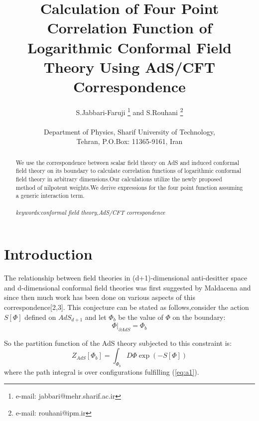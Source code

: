 \documentclass[a4paper,12pt]{article}
\begin{document}
\title{Calculation of Four Point Correlation Function of Logarithmic Conformal Field Theory Using AdS/CFT
Correspondence}
\author{S.Jabbari-Faruji    \footnote{e-mail: jabbari@mehr.sharif.ac.ir}  and
S.Rouhani
\footnote{e-mail: rouhani@ipm.ir}\\
\\
Department of Physics, Sharif University of Technology,\\ Tehran,
P.O.Box: 11365-9161, Iran}
\date{}
\maketitle
\begin{abstract}
 We use the correspondence between scalar field theory on AdS
and induced conformal field theory on its boundary to calculate
correlation functions of logarithmic conformal field theory in
arbitrary dimensions.Our calculations utilize the newly proposed
method of nilpotent weights.We derive expressions for the four
point function assuming a generic interaction term.
\\
\\
{\it keywords:conformal field theory,AdS/CFT  correspondence}
\end{abstract}
\section{Introduction}
            The relationship between field theories in (d+1)-dimensional anti-desitter space and d-dimensional
          conformal field theories was first suggested by Maldacena  and since then much work has been done
          on various aspects of this correspondence[2,3].
            This conjecture can be stated as follows,consider the action $S[\Phi]$ defined on $AdS_{d+1}$ and let
            $\Phi_{b}$
          be the value of $\Phi$ on the boundary:
          \begin{equation}\label{eq:a1}
                                \Phi|_{\partial AdS}=\Phi_{b}
                                \end{equation}

         So the partition function of the AdS theory subjected to this constraint is:
\begin{equation}
         Z_{AdS}[\Phi_{b}]=\int_{\Phi_{b}}
         D\Phi\exp(-S[\Phi])\end{equation}
          where the path integral is over configurations fulfilling
         (\ref{eq:a1}).
\end{document}
